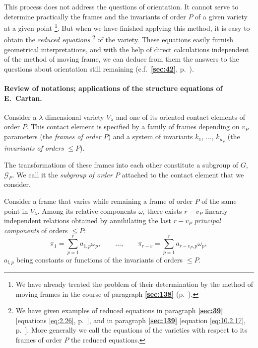 \documentclass[leqno,11pt]{book}
\numberwithin{equation}{chapter}
\theoremstyle{shape1}
\theoremstyle{shapesmall}
\newcommand{\fsref}[1]{{\rm\textsection\textbf{\ref{sec:#1}}}}
\begin{document}
This process does not address the questions of orientation. It cannot serve to determine practically the frames and the invariants of order $P$ of a given variety at a given point \footnote{We have already treated the problem of their determination by the method of moving frames in the course of paragraph \fsref{138} (p.~\pageref{sec:138}).}. But when we have finished applying this method, it is easy to obtain the \emph{reduced equations} \footnote{We have given examples of reduced equations in paragraph \fsref{39} [equations \eqref{eq:2.26}, p.~\pageref{eq:2.26}], and in paragraph \fsref{139} [equation \eqref{eq:10.2.17}, p.~\pageref{eq:10.2.17}]. More generally we call the equations of the varieties with respect to its frames of order $P$ the reduced equations.} of the variety. These equations easily furnish geometrical interpretations, and with the help of direct calculations independent of the method of moving frame, we can deduce from them the answers to the questions about orientation still remaining (c.f.~\fsref{42}, p.~\pageref{sec:42}).


\paragraph[{Review of notations; applications of the structure equations of E.~Cartan.}]{Review of notations; applications of the structure equations of E.~Cartan.}
\label{sec:171}
Consider a $\lambda$ dimensional variety $V_{\lambda}$ and one of its oriented contact elements of order $P$. This contact element is specified by a family of frames depending on $v_{P}$ parameters (the \emph{frames of order $P$}) and a system of invariants $k_{1}$, $\dots$, $k_{\mu_{P}}$ (the \emph{invariants of orders $\le P$}).

The transformations of these frames into each other constitute a subgroup of $G$, $\mathcal{G}_{P}$. We call it the \emph{subgroup of order $P$} attached to the contact element that we consider.

Consider a frame that varies while remaining a frame of order $P$ of the same point in $V_{\lambda}$. Among its relative components $\omega_{i}$ there exists $r-v_{P}$ linearly independent relations obtained by annihilating the last $r-v_{P}$ \emph{principal components} of orders $\le P$:
\begin{equation}
  \label{eq:12.1}
  \pi_{1}=\sum_{p=1}^{r}a_{1,p}\omega_{p},\qquad\dots,\qquad\pi_{r-v}=\sum_{p=1}^{r}a_{r-v_{P},p}\omega_{p},
\end{equation}
$a_{l,p}$ being constants or functions of the invariants of orders $\le P$.
\end{document}
